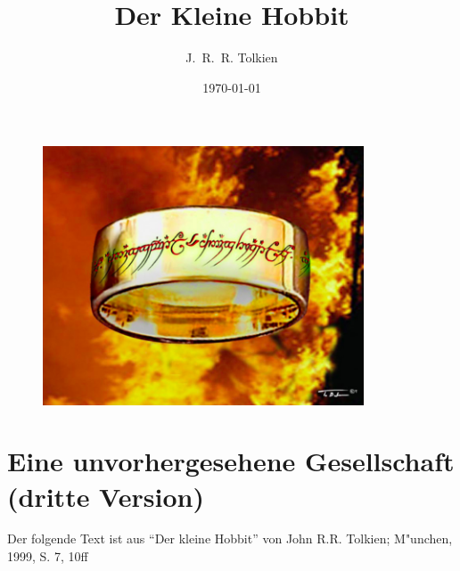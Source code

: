 \documentclass[a4paper]{article}
\title{Der Kleine Hobbit}
\author{J.~R.~R. Tolkien}
\date{\today}
\begin{document}
\maketitle
\begin{figure}[h]
\centering
%
%
\includegraphics[width=0.85\textwidth]{ring}
\end{figure}
\newpage
\tableofcontents
\listoffigures
\listoftables
\section{Eine unvorhergesehene Gesellschaft (dritte Version)}
\begin{center}
\tiny Der folgende Text ist aus "`Der kleine Hobbit"' von John R.R. Tolkien; M"unchen, 1999, S. 7, 10ff
\end{center}
\end{document}
